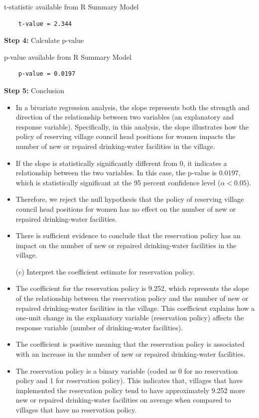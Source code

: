\documentclass[12pt,letterpaper]{article}
\begin{document}
\noindent t-statistic available from R Summary Model

\begin{verbatim}
	t-value = 2.344
\end{verbatim}
\vspace{.5cm}
\noindent\textbf{Step 4:} Calculate p-value

\noindent p-value available from R Summary Model

\begin{verbatim}
	p-value = 0.0197
\end{verbatim}
\vspace{.5cm}
\noindent\textbf{Step 5:} Conclusion 
\begin{itemize}
	\item 
	In a bivariate regression analysis, the slope represents both the strength and direction of the relationship between two variables (an explanatory and response variable). Specifically, in this analysis, the slope illustrates how the policy of reserving village council head positions for women impacts the number of new or repaired drinking-water facilities in the village.
	\item
	If the slope is statistically significantly different from 0, it indicates a relationship between the two variables. In this case, the p-value is 0.0197, which is statistically significant at the 95 percent confidence level ($\alpha < 0.05$).
	\item 
	Therefore, we reject the null hypothesis that the policy of reserving village council head positions for women has no effect on the number of new or repaired drinking-water facilities.
	\item 
	There is sufficient evidence to conclude that the reservation policy has an impact on the number of new or repaired drinking-water facilities in the village.
\end{itemize}

\newpage
\begin{enumerate}
	\item [(c)] Interpret the coefficient estimate for reservation policy. 
\end{enumerate}
\vspace{0.5cm}
\begin{itemize}
	\item 
	The coefficient for the reservation policy is 9.252, which represents the slope of the relationship between the reservation policy and the number of new or repaired drinking-water facilities in the village. This coefficient explains how a one-unit change in the explanatory variable (reservation policy) affects the response variable (number of drinking-water facilities).
	\item
	The coefficient is positive meaning that the reservation policy is associated with an increase in the number of new or repaired drinking-water facilities.
	\item
	The reservation policy is a binary variable (coded as 0 for no reservation policy and 1 for reservation policy). This indicates that, villages that have implemented the reservation policy tend to have approximately 9.252 more new or repaired drinking-water facilities on average when compared to villages that have no reservation policy. 
\end{itemize}
\end{document}
